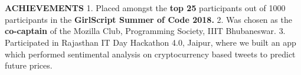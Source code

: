 \documentclass[a4paper, 12pt]{article}
\begin{document}
\vspace{-3.3cm}

\section*{}
\begin{vwcol}[widths={0.2, 0.8}, justify=flush, sep=0.7cm, rule=0pt, indent=1em]
\normalsize{\textbf{\textcolor{uclagold}{ACHIEVEMENTS}}}\newline\newline\newline\newline\newline\newline\newline\newline\newline\newline\newline\newline\newline
\large{1. Placed amongst the \textbf{top 25} participants out of 1000 participants in the \textbf{GirlScript Summer of Code 2018.}}\vspace{0.4cm}\newline
\large{2. Was chosen as the \textbf{co-captain} of the Mozilla Club, Programming Society, IIIT Bhubaneswar.}\vspace{0.4cm}\newline
\large{3. Participated in Rajasthan IT Day Hackathon 4.0, Jaipur, where we built an app which performed sentimental analysis on cryptocurrency based tweets to predict future prices.}\newline
\normalsize
\end{vwcol}
\end{document}
